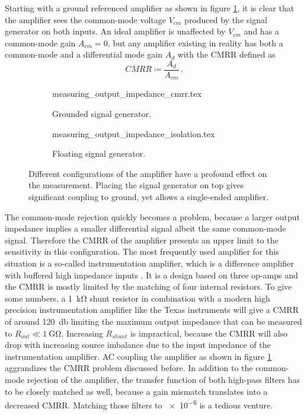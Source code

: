 Starting with a ground referenced amplifier as shown in figure \ref{fig:measuring_output_impedance_cmrr}, it is clear that the amplifier sees the common-mode voltage $V_{cm}$ produced by the signal generator on both inputs. An ideal amplifier is unaffected by $V_{cm}$ and has a common-mode gain $A_{cm} = 0$, but any amplifier existing in reality has both a common-mode and a differential mode gain $A_d$ with the CMRR defined as \citep[p. 328]{tietze_1991}
\begin{equation*}
    CMRR \coloneqq \frac{A_d}{A_{cm}}\,.
\end{equation*}
\begin{figure}[ht]
    \centering
    \begin{subfigure}{0.4\linewidth}
        \centering
        {measuring_output_impedance_cmrr.tex}
        \caption{Grounded signal generator.}
        \label{fig:measuring_output_impedance_cmrr}
    \end{subfigure}
    \begin{subfigure}{0.5\linewidth}
        \centering
        {measuring_output_impedance_isolation.tex}
        \caption{Floating signal generator.}
        \label{fig:measuring_output_impedance_isolation}
    \end{subfigure}
    \caption{Different configurations of the amplifier have a profound effect on the measurement. Placing the signal generator on top gives significant coupling to ground, yet allows a single-ended amplifier.}
    \label{fig:measuring_output_impedance_challenges}
\end{figure}

The common-mode rejection quickly becomes a problem, because a larger output impedance implies a smaller differential signal albeit the same common-mode signal. Therefore the CMRR of the amplifier presents an upper limit to the sensitivity in this configuration. The most frequently used amplifier for this situation is a so-called instrumentation amplifier, which is a difference amplifier with buffered high impedance inputs \cite{tietze_1991}. It is a design based on three op-amps and the CMRR is mostly limited by the matching of four internal resistors. To give some numbers, a \qty{1}{\kilo\ohm} shunt resistor in combination with a modern high precision instrumentation amplifier like the Texas instruments  \cite{datasheet_INA821} will give a CMRR of around \qty{120}{\decibel} limiting the maximum output impedance that can be measured to $R_{out} \ll \qty{1}{\giga \ohm}$. Increasing $R_{shunt}$ is impractical, because the CMRR will also drop with increasing source imbalance due to the input impedance of the instrumentation amplifier. AC coupling the amplifier as shown in figure \ref{fig:measuring_output_impedance_cmrr} aggrandizes the CMRR problem discussed before. In addition to the common-mode rejection of the amplifier, the transfer function of both high-pass filters has to be closely matched as well, because a gain mismatch translates into a decreased CMRR. Matching those filters to \num{e-6} is a tedious venture.


